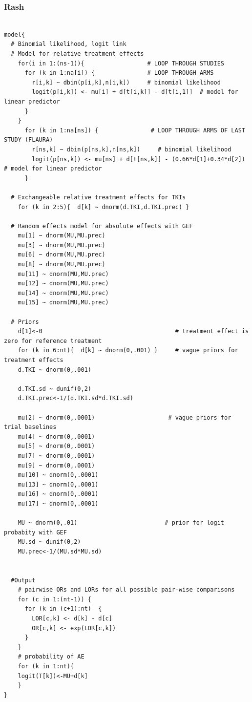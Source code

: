 \documentclass[11pt,final,fleqn]{article}\usepackage[]{graphicx}\usepackage[]{color}
\theoremstyle{plain}
\begin{document}
\begin{appendices}
\begin{verbatim}
\end{verbatim}

\subsubsection{Rash} 
\begin{verbatim} 

model{
  # Binomial likelihood, logit link
  # Model for relative treatment effects
    for(i in 1:(ns-1)){                  # LOOP THROUGH STUDIES
      for (k in 1:na[i]) {               # LOOP THROUGH ARMS
        r[i,k] ~ dbin(p[i,k],n[i,k])     # binomial likelihood
        logit(p[i,k]) <- mu[i] + d[t[i,k]] - d[t[i,1]]  # model for linear predictor
      }
    }   
      for (k in 1:na[ns]) {               # LOOP THROUGH ARMS OF LAST STUDY (FLAURA)
        r[ns,k] ~ dbin(p[ns,k],n[ns,k])     # binomial likelihood
        logit(p[ns,k]) <- mu[ns] + d[t[ns,k]] - (0.66*d[1]+0.34*d[2])  # model for linear predictor
      }
  
  # Exchangeable relative treatment effects for TKIs
    for (k in 2:5){  d[k] ~ dnorm(d.TKI,d.TKI.prec) }
  
  # Random effects model for absolute effects with GEF
    mu[1] ~ dnorm(MU,MU.prec)
    mu[3] ~ dnorm(MU,MU.prec)
    mu[6] ~ dnorm(MU,MU.prec) 
    mu[8] ~ dnorm(MU,MU.prec) 
    mu[11] ~ dnorm(MU,MU.prec) 
    mu[12] ~ dnorm(MU,MU.prec) 
    mu[14] ~ dnorm(MU,MU.prec)
    mu[15] ~ dnorm(MU,MU.prec)
       
  # Priors
    d[1]<-0                                      # treatment effect is zero for reference treatment
    for (k in 6:nt){  d[k] ~ dnorm(0,.001) }     # vague priors for treatment effects
    d.TKI ~ dnorm(0,.001)
    
    d.TKI.sd ~ dunif(0,2) 
    d.TKI.prec<-1/(d.TKI.sd*d.TKI.sd)
    
    mu[2] ~ dnorm(0,.0001)                     # vague priors for trial baselines
    mu[4] ~ dnorm(0,.0001)                       
    mu[5] ~ dnorm(0,.0001)                       
    mu[7] ~ dnorm(0,.0001)                       
    mu[9] ~ dnorm(0,.0001)
    mu[10] ~ dnorm(0,.0001)
    mu[13] ~ dnorm(0,.0001)
    mu[16] ~ dnorm(0,.0001)
    mu[17] ~ dnorm(0,.0001)
      
    MU ~ dnorm(0,.01)                         # prior for logit probabity with GEF
    MU.sd ~ dunif(0,2) 
    MU.prec<-1/(MU.sd*MU.sd)
    
      
  #Output 
    # pairwise ORs and LORs for all possible pair-wise comparisons                                       
    for (c in 1:(nt-1)) {                        
      for (k in (c+1):nt)  { 
        LOR[c,k] <- d[k] - d[c]
        OR[c,k] <- exp(LOR[c,k])
      }  
    }
    # probability of AE
    for (k in 1:nt){ 
    logit(T[k])<-MU+d[k]
    }
}


\end{verbatim}
\end{appendices}
\end{document}
